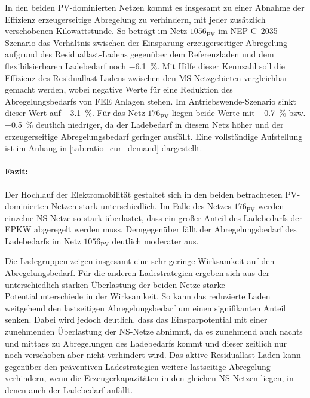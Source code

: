 

In den beiden \gls{PV}-dominierten Netzen kommt es insgesamt zu einer Abnahme der Effizienz erzeugerseitige Abregelung zu verhindern, mit jeder zusätzlich verschobenen Kilowattstunde.
So beträgt im Netz \(1056_{\text{PV}}\) im \gls{NEP} C~\num{2035} Szenario das Verhältnis zwischen der Einsparung erzeugerseitiger Abregelung aufgrund des Residuallast-Ladens gegenüber dem Referenzladen und dem flexibilsierbaren Ladebedarf noch \SI{-6.1}{\percent}.
Mit Hilfe dieser Kennzahl soll die Effizienz des Residuallast-Ladens zwischen den \gls{MS}-Netzgebieten vergleichbar gemacht werden, wobei negative Werte für eine Reduktion des Abregelungsbedarfs von \gls{FEE} Anlagen stehen.
Im Antriebswende-Szenario sinkt dieser Wert auf \SI{-3.1}{\percent}.
Für das Netz \(176_{\text{PV}}\) liegen beide Werte mit \SI{-0.7}{\percent} bzw. \SI{-0.5}{\percent} deutlich niedriger, da der Ladebedarf in diesem Netz höher und der erzeugerseitige Abregelungsbedarf geringer ausfällt.
Eine vollständige Aufstellung ist im Anhang in \autoref{tab:ratio_cur_demand} dargestellt.

\paragraph{Fazit:}

Der Hochlauf der Elektromobilität gestaltet sich in den beiden betrachteten \gls{PV}-dominierten Netzen stark unterschiedlich.
Im Falle des Netzes \(176_{\text{PV}}\) werden einzelne \gls{NS}-Netze so stark überlastet, dass ein großer Anteil des Ladebedarfs der \gls{EPKW} abgeregelt werden muss.
Demgegenüber fällt der Abregelungsbedarf des Ladebedarfs im Netz \(1056_{\text{PV}}\) deutlich moderater aus. \medskip

Die Ladegruppen zeigen insgesamt eine sehr geringe Wirksamkeit auf den Abregelungsbedarf.
Für die anderen Ladestrategien ergeben sich aus der unterschiedlich starken Überlastung der beiden Netze starke Potentialunterschiede in der Wirksamkeit.
So kann das reduzierte Laden weitgehend den lastseitigen Abregelungsbedarf um einen signifikanten Anteil senken.
Dabei wird jedoch deutlich, dass das Einsparpotential mit einer zunehmenden Überlastung der \gls{NS}-Netze abnimmt, da es zunehmend auch nachts und mittags zu Abregelungen des Ladebedarfs kommt und dieser zeitlich nur noch verschoben aber nicht verhindert wird.
Das aktive Residuallast-Laden kann gegenüber den präventiven Ladestrategien weitere lastseitige Abregelung verhindern, wenn die Erzeugerkapazitäten in den gleichen \gls{NS}-Netzen liegen, in denen auch der Ladebedarf anfällt.\medskip

